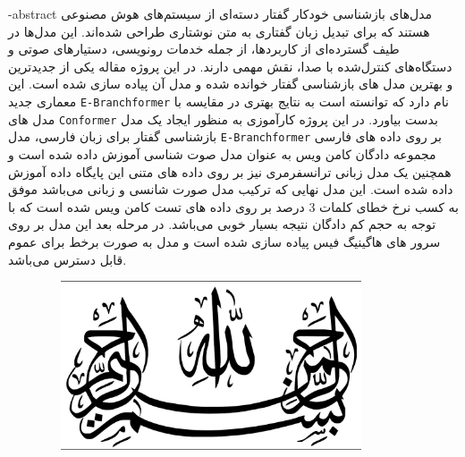 

\fa-abstract
{
مدل‌های بازشناسی خودکار گفتار دسته‌ای از سیستم‌های هوش مصنوعی هستند که برای تبدیل زبان گفتاری به متن نوشتاری طراحی شده‌اند. این مدل‌ها در طیف گسترده‌ای از کاربردها، از جمله خدمات رونویسی، دستیارهای صوتی و دستگاه‌های کنترل‌شده با صدا، نقش مهمی دارند.
\newline
در این پروژه مقاله یکی از جدیدترین و بهترین مدل های بازشناسی گفتار خوانده شده و مدل آن پیاده سازی شده است. این معماری جدید \texttt{E-Branchformer} نام دارد که توانسته است به نتایج بهتری در مقایسه با مدل های \texttt{Conformer} بدست بیاورد. در این پروژه کارآموزی به منظور ایجاد یک مدل بازشناسی گفتار برای زبان فارسی، مدل  \texttt{E-Branchformer} بر روی داده های فارسی مجموعه دادگان کامن ویس به عنوان مدل صوت شناسی آموزش داده شده است و همچنین یک مدل زبانی ترانسفرمری نیز بر روی داده های متنی این پایگاه داده آموزش داده شده است. این مدل نهایی که ترکیب مدل صورت شانسی و زبانی می‌باشد موفق به کسب نرخ خطای کلمات  3 درصد بر روی داده های تست کامن ویس شده است که با توجه به حجم کم دادگان نتیجه بسیار خوبی می‌باشد. در مرحله بعد این مدل بر روی سرور های هاگینیگ فیس پیاده سازی شده است و مدل به صورت برخط  برای عموم قابل دسترس می‌باشد.}





\AUTtitle
\vspace*{7cm}
\thispagestyle{empty}
\begin{center}
\includegraphics[height=5cm,width=12cm]{Images/besm.jpg}
\end{center}
